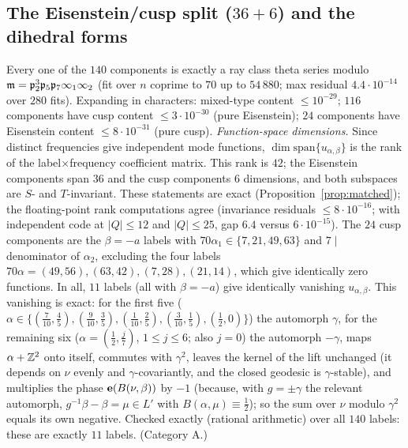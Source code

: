 \subsection{\texorpdfstring{The Eisenstein/cusp split ($36+6$) and the dihedral forms}{The Eisenstein/cusp split (36+6) and the dihedral forms}}\label{sec:dihedral}
Every one of the $140$ components is exactly a ray class theta series modulo $\mathfrak{m}=\mathfrak{p}_2^3\mathfrak{p}_5\mathfrak{p}_7\infty_1\infty_2$ (fit over $n$ coprime to $70$
up to $54\,880$; max residual $4.4\cdot10^{-14}$ over $280$ fits). Expanding in characters: mixed-type content $\le10^{-29}$; $116$ components have
cusp content $\le3\cdot10^{-30}$ (pure Eisenstein); $24$ components have Eisenstein content $\le8\cdot10^{-31}$ (pure cusp).
\emph{Function-space dimensions.} Since distinct frequencies give independent mode functions, $\dim\mathrm{span}\{u_{\alpha,\beta}\}$ is the rank of the
label$\times$frequency coefficient matrix. This rank is $42$; the Eisenstein components span $36$ and the cusp components $6$ dimensions, and both
subspaces are $S$- and $T$-invariant. These statements are exact (Proposition~\ref{prop:matched}); the floating-point rank computations agree
(invariance residuals $\le8\cdot10^{-16}$; with independent code at $|Q|\le12$ and $|Q|\le25$, gap $6.4$ versus $6\cdot10^{-15}$).
The $24$ cusp components are the $\beta=-a$ labels with $70\alpha_1\in\{7,21,49,63\}$ and $7\mid$ denominator of $\alpha_2$, excluding the four labels
$70\alpha=(49,56),(63,42),(7,28),(21,14)$, which give identically zero functions. In all, $11$ labels (all with $\beta=-a$) give identically vanishing $u_{\alpha,\beta}$.
This vanishing is exact: for the first five ($\alpha\in\{(\tfrac7{10},\tfrac45),(\tfrac9{10},\tfrac35),(\tfrac1{10},\tfrac25),(\tfrac3{10},\tfrac15),(\tfrac12,0)\}$) the
automorph $\gamma$, for the remaining six ($\alpha=(\tfrac12,\tfrac j7)$, $1\le j\le6$; also $j=0$) the automorph $-\gamma$, maps $\alpha+\mathbb{Z}^2$ onto itself, commutes
with $\gamma^2$, leaves the kernel of the lift unchanged (it depends on $\nu$ evenly and $\gamma$-covariantly, and the closed geodesic is $\gamma$-stable), and
multiplies the phase $\mathbf{e}(B(\nu,\beta))$ by $-1$ (because, with $g=\pm\gamma$ the relevant automorph, $g^{-1}\beta-\beta=\mu\in L'$ with $B(\alpha,\mu)\equiv\tfrac12$); so the sum over $\nu$ modulo
$\gamma^2$ equals its own negative. Checked exactly (rational arithmetic) over all $140$ labels: these are exactly $11$ labels. (Category A.)

